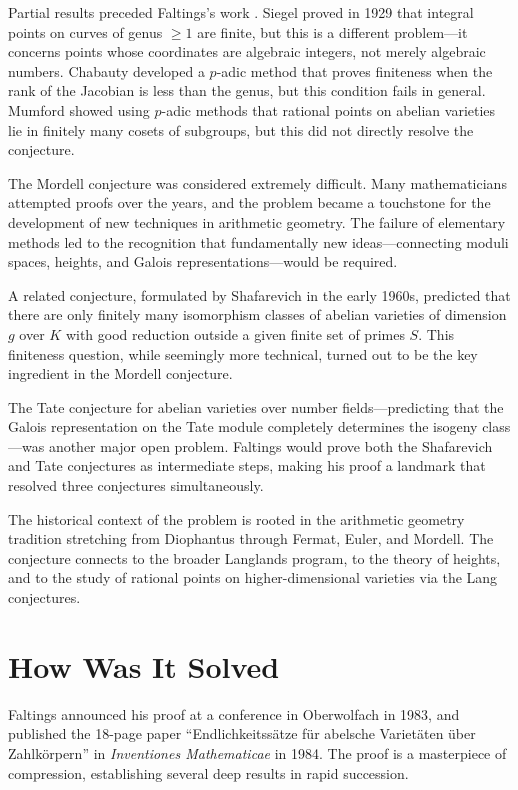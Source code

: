 Partial results preceded Faltings's work \cite{faltings1983}. Siegel proved in 1929 that integral points on curves of genus $\geq 1$ are finite, but this is a different problem---it concerns points whose coordinates are algebraic integers, not merely algebraic numbers. Chabauty developed a $p$-adic method that proves finiteness when the rank of the Jacobian is less than the genus, but this condition fails in general. Mumford showed using $p$-adic methods that rational points on abelian varieties lie in finitely many cosets of subgroups, but this did not directly resolve the conjecture.

The Mordell conjecture was considered extremely difficult. Many mathematicians attempted proofs over the years, and the problem became a touchstone for the development of new techniques in arithmetic geometry. The failure of elementary methods led to the recognition that fundamentally new ideas---connecting moduli spaces, heights, and Galois representations---would be required.

A related conjecture, formulated by Shafarevich in the early 1960s, predicted that there are only finitely many isomorphism classes of abelian varieties of dimension $g$ over $K$ with good reduction outside a given finite set of primes $S$. This finiteness question, while seemingly more technical, turned out to be the key ingredient in the Mordell conjecture.

The Tate conjecture for abelian varieties over number fields---predicting that the Galois representation on the Tate module completely determines the isogeny class---was another major open problem. Faltings would prove both the Shafarevich and Tate conjectures as intermediate steps, making his proof a landmark that resolved three conjectures simultaneously.

The historical context of the problem is rooted in the arithmetic geometry tradition stretching from Diophantus through Fermat, Euler, and Mordell. The conjecture connects to the broader Langlands program, to the theory of heights, and to the study of rational points on higher-dimensional varieties via the Lang conjectures.

\section{How Was It Solved}

Faltings announced his proof at a conference in Oberwolfach in 1983, and published the 18-page paper ``Endlichkeitss\"atze f\"ur abelsche Variet\"aten \"uber Zahlk\"orpern'' in \emph{Inventiones Mathematicae} in 1984. The proof is a masterpiece of compression, establishing several deep results in rapid succession.

